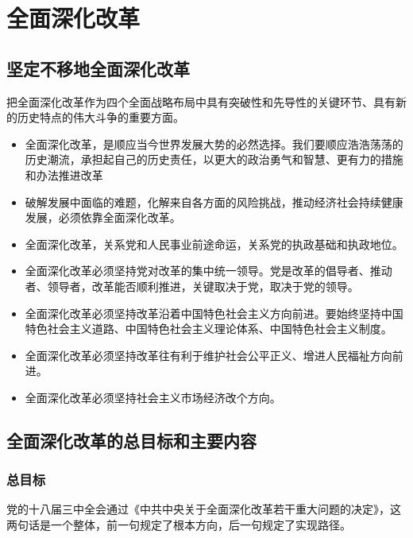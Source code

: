 \section{全面深化改革}
    \subsection{坚定不移地全面深化改革}
        把全面深化改革作为四个全面战略布局中具有突破性和先导性的关键环节、具有新的历史特点的伟大斗争的重要方面。
        \begin{itemize}
            \item 全面深化改革，是顺应当今世界发展大势的必然选择。我们要顺应浩浩荡荡的历史潮流，承担起自己的历史责任，以更大的政治勇气和智慧、更有力的措施和办法推进改革
            \item {}破解发展中面临的难题，化解来自各方面的风险挑战，推动经济社会持续健康发展，必须依靠全面深化改革。
            \item 全面深化改革，关系党和人民事业前途命运，关系党的执政基础和执政地位。
        \end{itemize}

        \begin{itemize}
            \item 全面深化改革必须坚持党对改革的集中统一领导。党是改革的倡导者、推动者、领导者，改革能否顺利推进，关键取决于党，取决于党的领导。
            \item 全面深化改革必须坚持改革沿着中国特色社会主义方向前进。要始终坚持中国特色社会主义道路、中国特色社会主义理论体系、中国特色社会主义制度。
            \item 全面深化改革必须坚持改革往有利于维护社会公平正义、增进人民福祉方向前进。
            \item 全面深化改革必须坚持社会主义市场经济改个方向。
        \end{itemize}

    \subsection{全面深化改革的总目标和主要内容}
        \subsubsection{总目标}
            党的十八届三中全会通过《中共中央关于全面深化改革若干重大问题的决定》，这两句话是一个整体，前一句规定了根本方向，后一句规定了实现路径。

